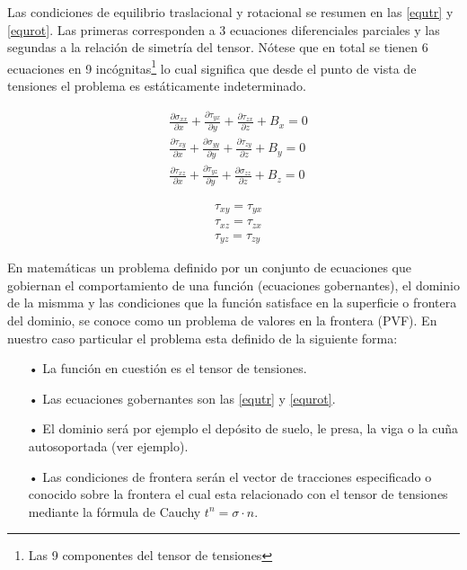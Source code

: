 \documentclass[../notas medios.tex]{subfiles}
\begin{document}
Las condiciones de equilibrio traslacional y rotacional se resumen en las \cref{equtr} y \cref{equrot}. Las primeras corresponden a 3 ecuaciones diferenciales parciales y las segundas a la relación de simetría del tensor. Nótese que en total se tienen 6 ecuaciones en 9 incógnitas\footnote{Las 9 componentes del tensor de tensiones} lo cual significa que desde el punto de vista de tensiones el problema es estáticamente indeterminado.

\begin{equation} \label{equtr}
\begin{split}
& \frac{{\partial {\sigma _{xx}}}}{{\partial x}} + \frac{{\partial {\tau _{yx}}}}{{\partial y}} + \frac{{\partial {\tau _{zx}}}}{{\partial z}} + {B_x} = 0 \\
& \frac{{\partial {\tau _{xy}}}}{{\partial x}} + \frac{{\partial {\sigma _{yy}}}}{{\partial y}} + \frac{{\partial {\tau _{zy}}}}{{\partial z}} + {B_y} = 0 \\
& \frac{{\partial {\tau _{xz}}}}{{\partial x}} + \frac{{\partial {\tau _{yz}}}}{{\partial y}} + \frac{{\partial {\sigma _{zz}}}}{{\partial z}} + {B_z} = 0 
\end{split}
\end{equation}

\begin{equation} \label{equrot}
\begin{split}
& \tau _{xy} = {\tau _{yx}} \\
& \tau _{xz} = {\tau _{zx}} \\
& \tau _{yz} = {\tau _{zy}}
\end{split}
\end{equation}

En matemáticas un problema definido por un conjunto de ecuaciones que gobiernan el comportamiento de una función (ecuaciones gobernantes), el dominio de la mismma y las condiciones que la función satisface en la superficie o frontera del dominio, se conoce como un problema de valores en la frontera (PVF). En nuestro caso particular el problema esta definido de la siguiente forma:

\begin{itemize}
\item[•] La función en cuestión es el tensor de tensiones.
\item[•] Las ecuaciones gobernantes son las \cref{equtr} y \cref{equrot}.
\item[•] El dominio será por ejemplo el depósito de suelo, le presa, la viga o la cuña autosoportada (ver ejemplo).
\item[•] Las condiciones de frontera serán el vector de tracciones especificado o conocido sobre la frontera el cual esta relacionado con el tensor de tensiones mediante la fórmula de Cauchy ${t^n} = \sigma  \cdot n$.
\end{itemize}
\end{document}
